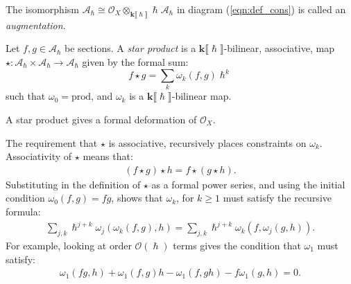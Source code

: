     

    

   
   
    \begin{rem} The isomorphism 
    \( \mathcal{A}_\hslash \cong \mathcal{O}_X \otimes_{\mathbf{k}\lBrack \hslash \rBrack} \hslash \mathcal{A}_\hslash\) in diagram (\ref{eqn:def_cons}) is called an \textit{augmentation}.
    \end{rem}
    
    
    \begin{defn}
    \label{defn:star_prod}
    Let \(f,g \in  \mathcal{A}_{\hslash}\) be sections. A \emph{star product} is a \(\mathbf{k}\lBrack \hslash \rBrack \)-bilinear, associative, map
    \(\star : \mathcal{A}_{\hslash}\times \mathcal{A}_{\hslash} \rightarrow \mathcal{A}_{\hslash}\)
    given by the formal sum:
    \begin{equation} 
        \label{eqn:star_prod_formal}
        f \star g = \sum_k \omega_k(f,g) \hslash^k
    \end{equation}
    such that \(\omega_0 = \mathrm{prod} \), and \(\omega_k\) is a \( \mathbf{k}\lBrack \hslash \rBrack\)-bilinear map. 
    \end{defn}
    

    \begin{lem}
    A star product gives a formal deformation of \( \mathcal{O}_X\). 
    \end{lem}
    
    The requirement that \( \star \) is associative, recursively places constraints on \( \omega_k\). Associativity of \( \star\) means that:
    \begin{align*}
        (f \star g) \star h = f \star (g \star h).
    \end{align*}
    Substituting in the definition of \( \star\) as a formal power series, and using the initial condition \( \omega_{0}(f,g) = fg\), shows that \( \omega_k\), for \( k \geq 1\) must satisfy the recursive formula: 
    \begin{align}
        \sum_{j,k} \hslash^{j+k} \omega_j (\omega_k ( f ,g ),h) = \sum_{j,k} \hslash^{j+k} \omega_k(f,\omega_j(g,h)).
    \end{align}
    For example, looking at order \( \mathcal{O}(\hslash)\) terms gives the condition that \( \omega_1\) must satisfy:
    \begin{align*}
    \omega_{1}(f g, h)  +  \omega_1(f,g) h  - \omega_{1}(f, g h)  - f \omega_{1}(g,h) = 0.
    \end{align*}
    

